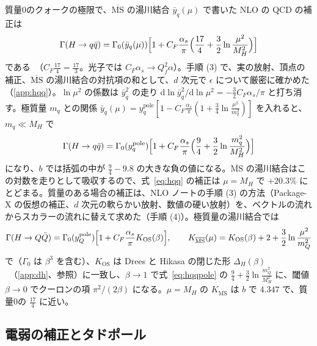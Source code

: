 \documentclass[a4paper,10pt]{ltjsarticle}
\newcommand{\dd}{\mathrm{d}}
\newcommand{\MSbar}{\overline{\mathrm{MS}}}
\begin{document}
質量0のクォークの極限で、$\MSbar$ の湯川結合 $\bar y_q(\mu)$ で書いた NLO の QCD の補正は
\begin{equation}
\Gamma(H\to q\bar q)=\Gamma_0(\bar y_q(\mu))\Bigl[1+C_F\frac{\alpha_s}\pi\Bigl(\frac{17}4+\frac32\ln\frac{\mu^2}{M_H^2}\Bigr)\Bigr]
\label{eq:hqq}
\end{equation}
である~\cite{bl80}（$C_F\frac{17}4=\frac{17}3$。光子では $C_F\alpha_s\to Q_f^2\alpha$）。手順 (3) で、実の放射、頂点の補正、$\MSbar$ の湯川結合の対抗項の和として、$d$ 次元で $\epsilon$ について厳密に確かめた（\ref{app:hqq}）。$\ln\mu^2$ の係数は $\bar y_q^2$ の走り $\dd\ln\bar y_q^2/\dd\ln\mu^2=-\frac32C_F\alpha_s/\pi$ と打ち消す。極質量 $m_q$ との関係 $\bar y_q(\mu)=y_q^{\mathrm{pole}}[1-C_F\frac{\alpha_s}\pi(1+\frac34\ln\frac{\mu^2}{m_q^2})]$ を入れると、$m_q\ll M_H$ で
\begin{equation}
\Gamma(H\to q\bar q)=\Gamma_0(y_q^{\mathrm{pole}})\Bigl[1+C_F\frac{\alpha_s}\pi\Bigl(\frac94+\frac32\ln\frac{m_q^2}{M_H^2}\Bigr)\Bigr]
\label{eq:hqqpole}
\end{equation}
になり、$b$ では括弧の中が $\frac94-9.8$ の大きな負の値になる。$\MSbar$ の湯川結合はこの対数を走りとして吸収するので、式~\eqref{eq:hqq} の補正は $\mu=M_H$ で $+20.3\%$ にとどまる。質量のある場合の補正は、NLO ノートの手順 (3) の方法（Package-X の仮想の補正、$d$ 次元の軟らかい放射、数値の硬い放射）を、ベクトルの流れからスカラーの流れに替えて求めた（手順 (4)）。極質量の湯川結合では
\begin{equation}
\Gamma(H\to Q\bar Q)=\Gamma_0(y_Q^{\mathrm{pole}})\Bigl[1+C_F\frac{\alpha_s}\pi K_{\mathrm{OS}}(\beta)\Bigr],\qquad
K_{\MSbar}(\mu)=K_{\mathrm{OS}}(\beta)+2+\frac32\ln\frac{\mu^2}{m_Q^2}
\label{eq:hqqmass}
\end{equation}
で（$\Gamma_0$ は $\beta^3$ を含む）、$K_{\mathrm{OS}}$ は Drees と Hikasa の閉じた形 $\Delta_H(\beta)$~\cite{dh90}（\ref{app:dh}、参照）に一致し、$\beta\to1$ で式~\eqref{eq:hqqpole} の $\frac94+\frac32\ln\frac{m_Q^2}{M_H^2}$ に、閾値 $\beta\to0$ でクーロンの項 $\pi^2/(2\beta)$ になる。$\mu=M_H$ の $K_{\MSbar}$ は $b$ で $4.347$ で、質量0の $\frac{17}4$ に近い。

\subsection{電弱の補正とタドポール}\label{sec:ew}
\end{document}
